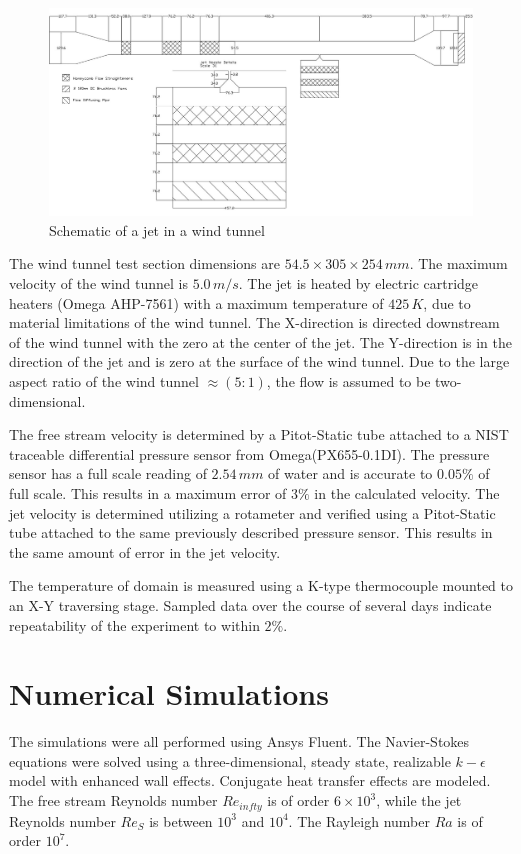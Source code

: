 \documentclass[preprint,12pt]{elsarticle}
\begin{document}
\begin{figure}[!tbp]
\begin{center}
\includegraphics[scale=.30]{windtunneljet.jpg}
\caption{Schematic of a jet in a wind tunnel}
\label{fig:diagramjet}
\end{center}
\end{figure}

The wind tunnel test section dimensions are $54.5\times305\times 254\,mm$.  The maximum velocity of the wind tunnel is $5.0\,m/s$.  The jet is heated by electric cartridge heaters (Omega AHP-7561) with a maximum temperature of $425\,K$, due to material limitations of the wind tunnel.  The X-direction is directed downstream of the wind tunnel with the zero at the center of the jet.  The Y-direction is in the direction of the jet and is zero at the surface of the wind tunnel.  Due to the large aspect ratio of the wind tunnel $\approx\left(5:1\right)$, the flow is assumed to be two-dimensional.

The free stream velocity is determined by a Pitot-Static tube attached to a NIST traceable differential pressure sensor from Omega(PX655-0.1DI).  The pressure sensor has a full scale reading of $2.54\,mm$ of water and is accurate to $0.05\%$ of full scale.  This results in a maximum error of $3\%$ in the calculated velocity.  The jet velocity is determined utilizing a rotameter and verified using a Pitot-Static tube attached to the same previously described pressure sensor.  This results in the same amount of error in the jet velocity.

The temperature of domain is measured using a K-type thermocouple mounted to an X-Y traversing stage.  Sampled data over the course of several days indicate repeatability of the experiment to within $2\%$.

\section{Numerical Simulations}
The simulations were all performed using Ansys Fluent\cite{fluentsoftware}.  The Navier-Stokes equations were solved using a three-dimensional, steady state, realizable $k-\epsilon$ model with enhanced wall effects.  Conjugate heat transfer effects are modeled.  The free stream Reynolds number $Re_{infty}$ is of order $6\times10^3$, while the jet Reynolds number $Re_S$ is between $10^3$ and $10^4$.  The Rayleigh number $Ra$ is of order $10^7$.
\end{document}
